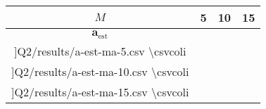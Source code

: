 \documentclass[12pt,onecolumn,a4paper]{article}
\begin{document}
	\begin{table}
		\centering
		\caption{}
		\begin{LTR}
			\begin{tabular}{|c||c|c|c|}
				\hline
				\(M\)& 5 & 10 & 15 \\\hline
				\(	\bm{a}_\text{est} \) & 
				\(
				\begin{matrix}
					\csvreader[head=false, late after line=\\]{Q2/results/a-est-ma-5.csv}{}%
					{\num{\csvcoli}}
				\end{matrix}
				\) &
				\(
				\begin{matrix}
					\csvreader[head=false, late after line=\\]{Q2/results/a-est-ma-10.csv}{}%
					{\num{\csvcoli}}
				\end{matrix}
				\) & 
				\(
				\begin{matrix}
					\csvreader[head=false, late after line=\\]{Q2/results/a-est-ma-15.csv}{}%
					{\num{\csvcoli}}
				\end{matrix}
				\)
				\\\hline
			\end{tabular}
		\end{LTR}
	\end{table}
	
	
	
	
	
	
	
\end{document}
